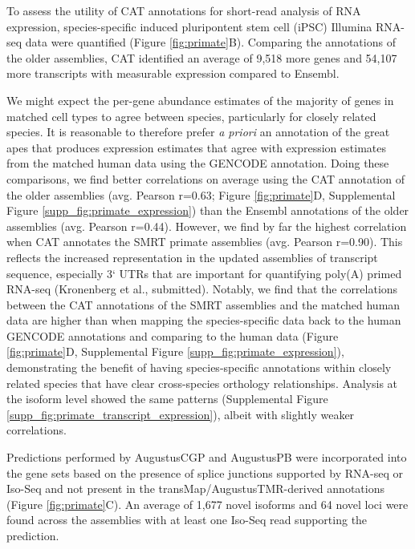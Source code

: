 \documentclass[fleqn,10pt]{wlscirep}
\begin{document}
To assess the utility of CAT annotations for short-read analysis of RNA expression, species-specific induced pluripontent stem cell (iPSC) Illumina RNA-seq data were quantified (Figure \ref{fig:primate}B). Comparing the annotations of the older assemblies, CAT identified an average of 9,518 more genes and 54,107 more transcripts with measurable expression compared to Ensembl.

We might expect the per-gene abundance estimates of the majority of genes in matched cell types to agree between species, particularly for closely related species. It is reasonable to therefore prefer \textit{a priori} an annotation of the great apes that produces expression estimates that agree with expression estimates from the matched human data using the GENCODE annotation. Doing these comparisons, we find better correlations on average using the CAT annotation of the older assemblies (avg. Pearson r=0.63; Figure \ref{fig:primate}D, Supplemental Figure \ref{supp_fig:primate_expression}) than the Ensembl annotations of the older assemblies (avg. Pearson r=0.44). However, we find by far the highest correlation when CAT annotates the SMRT primate assemblies (avg. Pearson r=0.90). This reflects the increased representation in the updated assemblies of transcript sequence, especially 3` UTRs that are important for quantifying poly(A) primed RNA-seq (Kronenberg et al., submitted). Notably, we find that the correlations between the CAT annotations of the SMRT assemblies and the matched human data are higher than when mapping the species-specific data back to the human GENCODE annotations and comparing to the human data (Figure \ref{fig:primate}D, Supplemental Figure \ref{supp_fig:primate_expression}), demonstrating the benefit of having species-specific annotations within closely related species that have clear cross-species orthology relationships. Analysis at the isoform level showed the same patterns (Supplemental Figure \ref{supp_fig:primate_transcript_expression}), albeit with slightly weaker correlations.

Predictions performed by AugustusCGP and AugustusPB were incorporated into the gene sets based on the presence of splice junctions supported by RNA-seq or Iso-Seq and not present in the transMap/AugustusTMR-derived annotations (Figure \ref{fig:primate}C). An average of 1,677 novel isoforms and 64 novel loci were found across the assemblies with at least one Iso-Seq read supporting the prediction.
\end{document}
